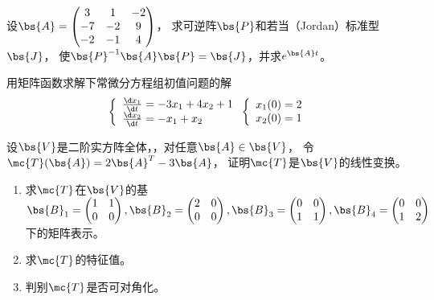 \documentclass[12pt, a4paper, oneside, UTF8]{ctexbook}
\begin{document}
\begin{question}
    设$\bs{A}=\begin{pmatrix}
        3&1&-2\\
        -7&-2&9\\
        -2&-1&4
    \end{pmatrix}$，
    求可逆阵$\bs{P}$和若当（Jordan）标准型$\bs{J}$，
    使$\bs{P}^{-1}\bs{A}\bs{P}=\bs{J}$，并求$e^{\bs{A}t}$。
\end{question}


\begin{question}
    用矩阵函数求解下常微分方程组初值问题的解
    \begin{align*}
    \left\{
        \begin{array}{ll}
            \frac{\d x_1}{\d t}=-3x_1+4x_2+1\\
            \frac{\d x_2}{\d t}=-x_1+x_2
        \end{array}
        \right.
    \left\{
        \begin{array}{ll}
            x_1(0)=2\\
            x_2(0)=1
        \end{array}
        \right.
    \end{align*}
\end{question}

\begin{question}
    设$\bs{V}$是二阶实方阵全体，，对任意$\bs{A}\in \bs{V}$，
    令$\mc{T}(\bs{A})=2\bs{A}^T-3\bs{A}$，
    证明$\mc{T}$是$\bs{V}$的线性变换。
    \begin{enumerate}[label=(\arabic{*})]
        \item 求$\mc{T}$在$\bs{V}$的基$\bs{B}_1=\begin{pmatrix}
            1&1\\
            0&0
        \end{pmatrix},\bs{B}_2=\begin{pmatrix}
            2&0\\
            0&0
        \end{pmatrix},\bs{B}_3=\begin{pmatrix}
            0&0\\
            1&1
        \end{pmatrix},\bs{B}_4=\begin{pmatrix}
            0&0\\
            1&2
        \end{pmatrix}$下的矩阵表示。
        \item 求$\mc{T}$的特征值。
        \item 判别$\mc{T}$是否可对角化。
    \end{enumerate}
\end{question}
\end{document}
